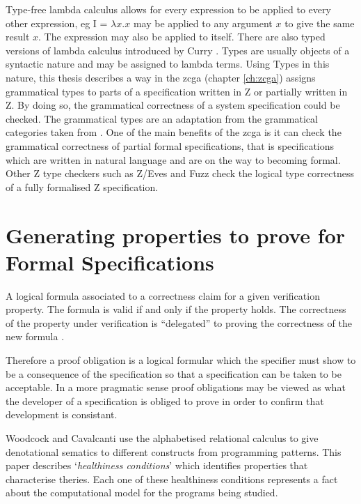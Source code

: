 Type-free lambda calculus \cite{bar93} allows for every expression to be applied to every other expression, eg I = $\lambda x.x$ may be applied to any argument $x$ to give the same result $x$. The expression may also be applied to itself. There are also typed versions of lambda calculus introduced by Curry \cite{cu34}. Types are usually objects of a syntactic nature and may be assigned to lambda terms. Using Types in this nature, this thesis describes a way in the \gls{zcga} (chapter \ref{ch:zcga}) assigns grammatical types to parts of a specification written in Z or partially written in Z. By doing so, the grammatical correctness of a system specification could be checked. The grammatical types are an adaptation from the grammatical categories taken from \cite{wtt}. One of the main benefits of the \gls{zcga} is it can check the grammatical correctness of partial formal specifications, that is specifications which are written in natural language and are on the way to becoming formal. Other Z type checkers such as Z/Eves \cite{Saaltink99thez/eves} and Fuzz \cite{spiveyfuzz} check the logical type correctness of a fully formalised Z specification.

\section{Generating properties to prove for Formal Specifications}

\begin{defin}
A logical formula associated to a correctness claim for a given verification property. The formula is valid if and only if the property holds. The correctness of the property under verification is “delegated” to proving the correctness of the new formula \cite{handbookofembed}.
\end{defin}

Therefore a proof obligation is a logical formular which the specifier must show to be a consequence of the specification so that a specification can be taken to be acceptable. In a more pragmatic sense proof obligations may be viewed as what the developer of a specification is obliged to prove in order to confirm that development is consistant.

Woodcock and Cavalcanti \cite{woodcock2004tutorial} use the alphabetised relational calculus to give denotational sematics to different constructs from programming patterns. This paper describes `\emph{healthiness conditions}' which identifies properties that characterise theries. Each one of these healthiness conditions represents a fact about the computational model for the programs being studied.

